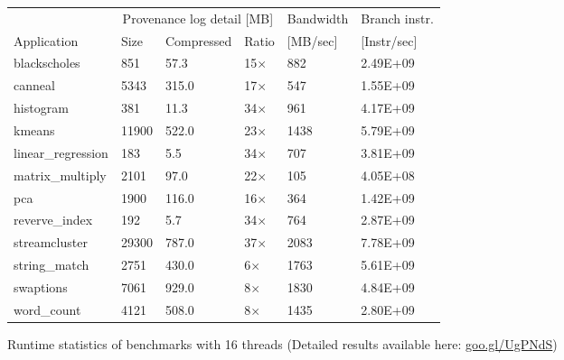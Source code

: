 \begin{figure}[t]
\centering
\myfontsize
{
\begin{tabular}{m{1.3cm}|m{.6cm}|m{1.2cm}|m{0.8cm}|m{1.25cm}|m{1.25cm}}
       & \multicolumn{3}{c|}{ Provenance log detail [MB] }   &  Bandwidth & Branch instr. \\
   { Application} & Size & Compressed & Ratio & [MB/sec] &  [Instr/sec] \\
  \hline \hline
    blackscholes & 851& 57.3 & 15$\times$& 882& 2.49E+09 \\
    canneal& 5343& 315.0 &  17$\times$& 547& 1.55E+09 \\
    histogram& 381& 11.3 & 34$\times$& 961& 4.17E+09 \\
    kmeans& 11900& 522.0 & 23$\times$& 1438& 5.79E+09 \\
    linear\_regression& 183& 5.5 & 34$\times$& 707& 3.81E+09 \\
    matrix\_multiply& 2101& 97.0 & 22$\times$& 105& 4.05E+08 \\
    pca& 1900& 116.0 & 16$\times$& 364& 1.42E+09 \\
    reverve\_index& 192& 5.7 & 34$\times$& 764& 2.87E+09 \\
    streamcluster& 29300& 787.0 & 37$\times$& 2083& 7.78E+09 \\
    string\_match& 2751& 430.0 & 6$\times$& 1763& 5.61E+09 \\
    swaptions& 7061& 929.0 & 8$\times$& 1830& 4.84E+09 \\
    word\_count& 4121& 508.0 & 8$\times$& 1435& 2.80E+09 \\

\hline
\end{tabular}
}

\caption{Runtime statistics of benchmarks with 16 threads (Detailed results available here: \href{https://goo.gl/UgPNdS}{goo.gl/UgPNdS}) }                                                                                                                                      \label{tab:apps}
\end{figure}
